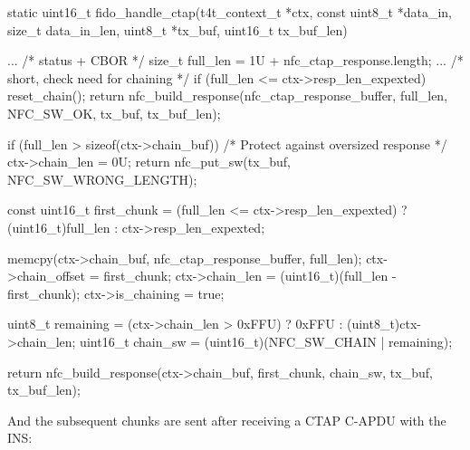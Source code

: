 \begtt 
static uint16_t fido_handle_ctap(t4t_context_t *ctx,
                                 const uint8_t *data_in, 
                                 size_t data_in_len,
                                 uint8_t *tx_buf, 
                                 uint16_t tx_buf_len)
{
    ...
    /* status + CBOR */
    size_t   full_len = 1U + nfc_ctap_response.length;   
    ...
    /* short, check need for chaining */
    if (full_len <= ctx->resp_len_expexted) {
        reset_chain();
        return nfc_build_response(nfc_ctap_response_buffer,
                                  full_len, 
                                  NFC_SW_OK, 
                                  tx_buf, 
                                  tx_buf_len);
    }
    
    if (full_len > sizeof(ctx->chain_buf))
    {
        /* Protect against oversized response */
        ctx->chain_len = 0U;
        return nfc_put_sw(tx_buf, NFC_SW_WRONG_LENGTH);
    }
    
    const uint16_t first_chunk = (full_len <= ctx->resp_len_expexted) ? 
                           (uint16_t)full_len : ctx->resp_len_expexted;
                           
    memcpy(ctx->chain_buf, nfc_ctap_response_buffer, full_len);
    ctx->chain_offset = first_chunk;
    ctx->chain_len    = (uint16_t)(full_len - first_chunk);
    ctx->is_chaining  = true;
    
    uint8_t remaining = (ctx->chain_len > 0xFFU) ? 
                         0xFFU : (uint8_t)ctx->chain_len;
    uint16_t chain_sw = (uint16_t)(NFC_SW_CHAIN | remaining);
    
    return nfc_build_response(ctx->chain_buf, 
                              first_chunk, 
                              chain_sw, 
                              tx_buf, 
                              tx_buf_len);
}
\endtt
 And the subsequent chunks are sent after receiving a CTAP C-APDU with the  INS:

